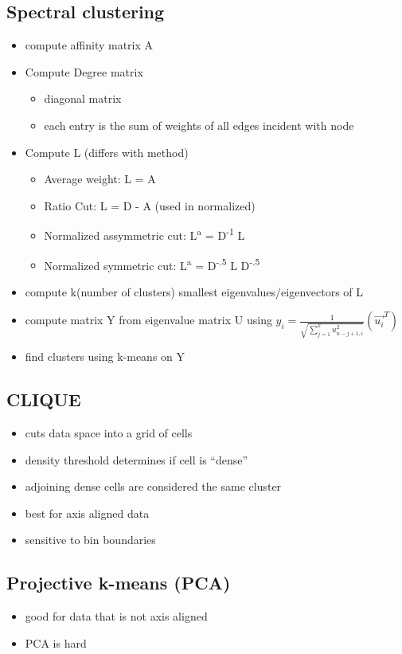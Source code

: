 \documentclass[11pt]{article}
\begin{document}
\subsection*{Spectral clustering}
\label{sec:orgd7985be}
\begin{itemize}
\item compute affinity matrix A
\item Compute Degree matrix
\begin{itemize}
\item diagonal matrix
\item each entry is the sum of weights of all edges incident with node
\end{itemize}
\item Compute L (differs with method)
\begin{itemize}
\item Average weight: L = A
\item Ratio Cut: L = D - A (used in normalized)
\item Normalized assymmetric cut: L\textsuperscript{a} = D\textsuperscript{-1} L
\item Normalized symmetric cut: L\textsuperscript{a} = D\textsuperscript{-.5} L D\textsuperscript{-.5}
\end{itemize}
\item compute k(number of clusters) smallest eigenvalues/eigenvectors of L
\item compute matrix Y from eigenvalue matrix U using \(y_i =
  \frac{1}{\sqrt{\sum^k_{j=1}u^2_{n-j+1, i}}}(\vec{u_i}^T)\)
\item find clusters using k-means on Y
\end{itemize}
\subsection*{CLIQUE}
\label{sec:orgc23d530}
\begin{itemize}
\item cuts data space into a grid of cells
\item density threshold determines if cell is ``dense''
\item adjoining dense cells are considered the same cluster
\item best for axis aligned data
\item sensitive to bin boundaries
\end{itemize}
\subsection*{Projective k-means (PCA)}
\label{sec:org5699ed8}
\begin{itemize}
\item good for data that is not axis aligned
\item PCA is hard
\end{itemize}
\end{document}
